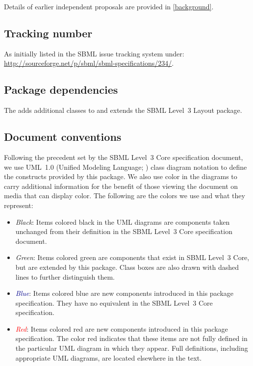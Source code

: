 Details of earlier independent proposals are provided 
in \ref{background}. 

\subsection{Tracking number} 
As initially listed in the SBML issue tracking system under:\\ 
\url{http://sourceforge.net/p/sbml/sbml-specifications/234/}. 

\subsection{Package dependencies} 

The \RenderPackage adds additional classes to \sbmlthreecore and extends the 
SBML Level~3 Layout package. 

\subsection{Document conventions} \label{conventions} 

Following the precedent set by the SBML Level~3 Core specification 
document, we use UML~1.0 (Unified Modeling Language; 
\citealt{eriksson:1998,oestereich:1999}) class diagram notation to 
define the constructs provided by this package. We also use color in the 
diagrams to carry additional information for the benefit of those 
viewing the document on media that can display color. The following are 
the colors we use and what they represent: 

\begin{itemize} 

\item[\raisebox{2.75pt}{\colorbox{black}{\rule{0.8pt}{0.8pt}}}] 
\emph{Black}: Items colored black in the UML diagrams are components 
taken unchanged from their definition in the SBML Level~3 Core 
specification document. 

\item[\raisebox{2.75pt}{\colorbox{mediumgreen}{\rule{0.8pt}{0.8pt}}}] 
\emph{\textcolor{mediumgreen}{Green}}: Items colored green are 
components that exist in SBML Level~3 Core, but are extended by this 
package. Class boxes are also drawn with dashed lines to further 
distinguish them. 

\item[\raisebox{2.75pt}{\colorbox{darkblue}{\rule{0.8pt}{0.8pt}}}] 
\emph{\textcolor{darkblue}{Blue}}: Items colored blue are new components 
introduced in this package specification. They have no equivalent in the 
SBML Level~3 Core specification. 

\item[\raisebox{2.75pt}{\colorbox{red}{\rule{0.8pt}{0.8pt}}}] 
\emph{\textcolor{red}{Red}}: Items colored red are new components 
introduced in this package specification. The color red indicates that these items are not fully defined in the particular UML diagram in which they appear. Full definitions, including appropriate UML diagrams, are located elsewhere in the text.
\end{itemize} 

